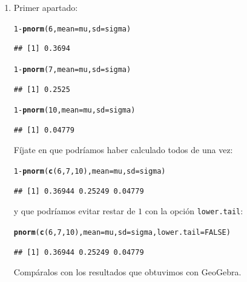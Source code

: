 \documentclass[10pt,a4paper]{article}\usepackage[]{graphicx}\usepackage[]{color}
\makeatletter
\newcommand{\hlnum}[1]{\textcolor[rgb]{0.686,0.059,0.569}{#1}}%
\newcommand{\hlopt}[1]{\textcolor[rgb]{0,0,0}{#1}}%
\newcommand{\hlstd}[1]{\textcolor[rgb]{0.345,0.345,0.345}{#1}}%
\newcommand{\hlkwc}[1]{\textcolor[rgb]{0.333,0.667,0.333}{#1}}%
\newcommand{\hlkwd}[1]{\textcolor[rgb]{0.737,0.353,0.396}{\textbf{#1}}}%
\newenvironment{kframe}{%
 \def\at@end@of@kframe{}%
 \ifinner\ifhmode%
  \def\at@end@of@kframe{\end{minipage}}%
  \begin{minipage}{\columnwidth}%
 \fi\fi%
 \def\FrameCommand##1{\hskip\@totalleftmargin \hskip-\fboxsep
 \colorbox{shadecolor}{##1}\hskip-\fboxsep
     \hskip-\linewidth \hskip-\@totalleftmargin \hskip\columnwidth}%
 \MakeFramed {\advance\hsize-\width
   \@totalleftmargin\z@ \linewidth\hsize
   \@setminipage}}%
 {\par\unskip\endMakeFramed%
 \at@end@of@kframe}
\newenvironment{knitrout}{}{} %
\makeatother
\begin{document}
\begin{enumerate}
\begin{enumerate}
          \item Primer apartado:
\begin{knitrout}
\color{fgcolor}\begin{kframe}
\begin{alltt}
  \hlnum{1} \hlopt{-} \hlkwd{pnorm}\hlstd{(}\hlnum{6}\hlstd{,} \hlkwc{mean}\hlstd{=mu,} \hlkwc{sd}\hlstd{=sigma)}
\end{alltt}
\begin{verbatim}
## [1] 0.3694
\end{verbatim}
\begin{alltt}
  \hlnum{1} \hlopt{-} \hlkwd{pnorm}\hlstd{(}\hlnum{7}\hlstd{,} \hlkwc{mean}\hlstd{=mu,} \hlkwc{sd}\hlstd{=sigma)}
\end{alltt}
\begin{verbatim}
## [1] 0.2525
\end{verbatim}
\begin{alltt}
  \hlnum{1} \hlopt{-} \hlkwd{pnorm}\hlstd{(}\hlnum{10}\hlstd{,} \hlkwc{mean}\hlstd{=mu,} \hlkwc{sd}\hlstd{=sigma)}
\end{alltt}
\begin{verbatim}
## [1] 0.04779
\end{verbatim}
\end{kframe}
\end{knitrout}
          Fíjate en que podríamos haber calculado todos de una vez:
\begin{knitrout}
\color{fgcolor}\begin{kframe}
\begin{alltt}
  \hlnum{1} \hlopt{-} \hlkwd{pnorm}\hlstd{(}\hlkwd{c}\hlstd{(}\hlnum{6}\hlstd{,} \hlnum{7}\hlstd{,} \hlnum{10}\hlstd{),} \hlkwc{mean}\hlstd{=mu,} \hlkwc{sd}\hlstd{=sigma)}
\end{alltt}
\begin{verbatim}
## [1] 0.36944 0.25249 0.04779
\end{verbatim}
\end{kframe}
\end{knitrout}
          y que podríamos evitar restar de $1$ con la opción {\tt lower.tail}:
\begin{knitrout}
\color{fgcolor}\begin{kframe}
\begin{alltt}
  \hlkwd{pnorm}\hlstd{(}\hlkwd{c}\hlstd{(}\hlnum{6}\hlstd{,} \hlnum{7}\hlstd{,} \hlnum{10}\hlstd{),} \hlkwc{mean}\hlstd{=mu,} \hlkwc{sd}\hlstd{=sigma,} \hlkwc{lower.tail}\hlstd{=}\hlnum{FALSE}\hlstd{)}
\end{alltt}
\begin{verbatim}
## [1] 0.36944 0.25249 0.04779
\end{verbatim}
\end{kframe}
\end{knitrout}
          Compáralos con los resultados que obtuvimos con GeoGebra.


\end{enumerate}
\end{enumerate}
\end{document}
